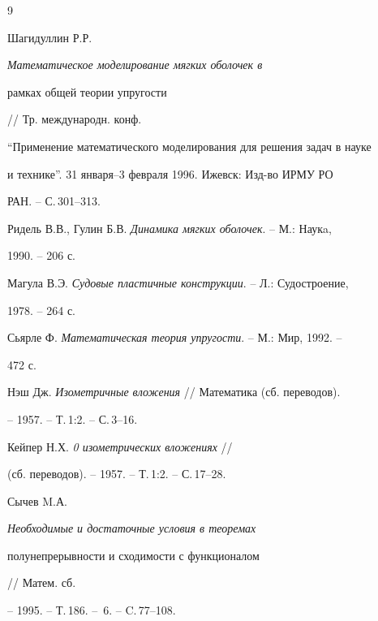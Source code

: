 \begin{thebibliography}{9}







Шагидуллин Р.Р. {\em Математическое моделирование мягких оболочек в


рамках общей теории упругости} // Тр. международн. конф.


``Применение математического моделирования для решения задач в науке


и технике''. 31 января--3 февраля 1996. Ижевск: Изд-во ИРМУ РО


РАН. -- С.\,301--313.




Ридель В.В., Гулин Б.В. {\em Динамика мягких оболочек}. -- М.: Наукa,


1990. -- 206 с.




Магула В.Э. {\em Судовые пластичные конструкции}. -- Л.: Судостроение,


1978. -- 264 с.




Сьярле Ф. {\em Математическая теория упругости}. -- М.: Мир, 1992. --


472 с.




Нэш Дж. {\em Изометричные вложения} // Математика (сб. переводов).


-- 1957. -- Т.\,1:2. -- С.\,3--16.




Кейпер Н.Х. {\em 0 изометрических вложениях} //


(сб. переводов). -- 1957. -- Т.\,1:2. -- С.\,17--28.




Сычев M.А. {\em Необходимые и достаточные условия в теоремах


полунепрерывности и сходимости с функционалом} // Матем. сб.


-- 1995. -- Т.\,186. -- \No\,6. -- C.\,77--108.





\end{thebibliography}





\vskip 2cm









\label{end}





